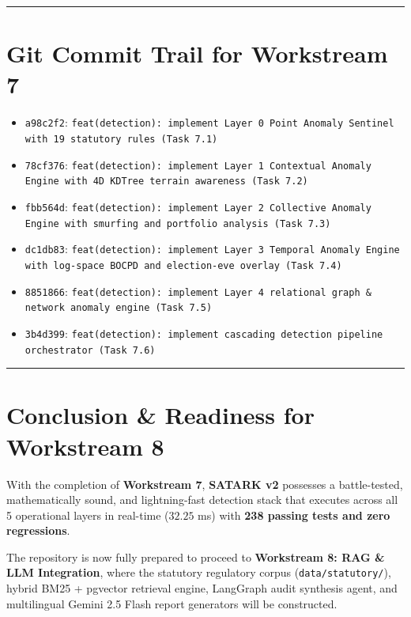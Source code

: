 \documentclass[11pt,a4paper]{article}
\begin{document}
\vspace{1em}\hrule\vspace{1em}

\section{Git Commit Trail for Workstream 7}

\begin{itemize}[leftmargin=1.5em, itemsep=2pt, topsep=3pt]
\item \texttt{a98c2f2}: \texttt{feat(detection): implement Layer 0 Point Anomaly Sentinel with 19 statutory rules (Task 7.1)}
\item \texttt{78cf376}: \texttt{feat(detection): implement Layer 1 Contextual Anomaly Engine with 4D KDTree terrain awareness (Task 7.2)}
\item \texttt{fbb564d}: \texttt{feat(detection): implement Layer 2 Collective Anomaly Engine with smurfing and portfolio analysis (Task 7.3)}
\item \texttt{dc1db83}: \texttt{feat(detection): implement Layer 3 Temporal Anomaly Engine with log-space BOCPD and election-eve overlay (Task 7.4)}
\item \texttt{8851866}: \texttt{feat(detection): implement Layer 4 relational graph \& network anomaly engine (Task 7.5)}
\item \texttt{3b4d399}: \texttt{feat(detection): implement cascading detection pipeline orchestrator (Task 7.6)}
\end{itemize}

\vspace{1em}\hrule\vspace{1em}

\section{Conclusion \& Readiness for Workstream 8}

With the completion of \textbf{Workstream 7}, \textbf{SATARK v2} possesses a battle-tested, mathematically sound, and lightning-fast detection stack that executes across all 5 operational layers in real-time ($32.25$ ms) with \textbf{238 passing tests and zero regressions}.

The repository is now fully prepared to proceed to \textbf{Workstream 8: RAG \& LLM Integration}, where the statutory regulatory corpus (\texttt{data/statutory/}), hybrid BM25 + pgvector retrieval engine, LangGraph audit synthesis agent, and multilingual Gemini 2.5 Flash report generators will be constructed.
\end{document}
